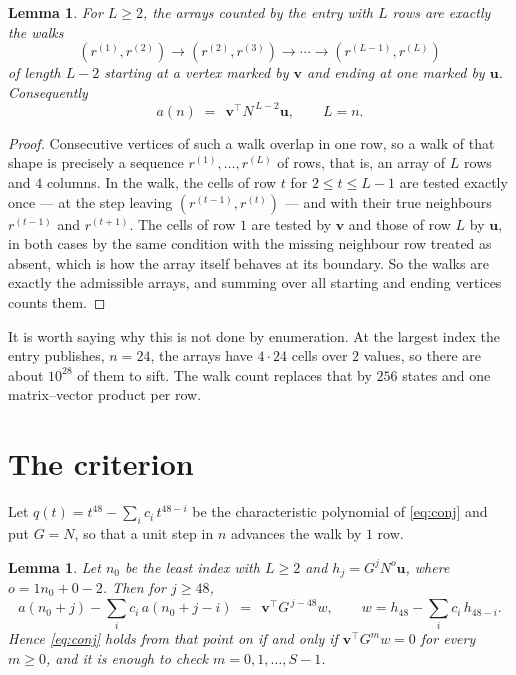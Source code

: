 \documentclass[11pt,a4paper]{article}
\theoremstyle{plain}
\newtheorem{lemma}[theorem]{Lemma}
\theoremstyle{definition}
\begin{document}
\begin{lemma}\label{lem:walk}
For $L\ge2$, the arrays counted by the entry with $L$ rows are exactly the walks
\[
(r^{(1)},r^{(2)})\to(r^{(2)},r^{(3)})\to\cdots\to(r^{(L-1)},r^{(L)})
\]
of length $L-2$ starting at a vertex marked by $\mathbf{v}$ and ending at one marked by
$\mathbf{u}$. Consequently
\[
a(n)\;=\;\,\mathbf{v}^{\!\top}N^{\,L-2}\mathbf{u},\qquad L=n .
\]
\end{lemma}

\begin{proof}
Consecutive vertices of such a walk overlap in one row, so a walk of that shape is
precisely a sequence $r^{(1)},\dots,r^{(L)}$ of rows, that is, an array of $L$ rows
and $4$ columns. In the walk, the cells of row $t$ for $2\le t\le L-1$ are tested
exactly once --- at the step leaving $(r^{(t-1)},r^{(t)})$ --- and with their true
neighbours $r^{(t-1)}$ and $r^{(t+1)}$. The cells of row $1$ are tested by
$\mathbf{v}$ and those of row $L$ by $\mathbf{u}$, in both cases by the same condition
with the missing neighbour row treated as absent, which is how the array itself behaves at
its boundary. So the walks are exactly the admissible arrays, and summing over all starting
and ending vertices counts them.
\end{proof}


It is worth saying why this is not done by enumeration. At the largest index the entry
publishes, $n=24$, the arrays have $4\cdot24$ cells over
$2$ values, so there are about $10^{28}$ of them to sift. The
walk count replaces that by $256$ states and one matrix--vector product per row.
\section{The criterion}

Let $q(t)=t^{48}-\sum_i c_i\,t^{48-i}$ be the characteristic polynomial of
\eqref{eq:conj} and put $G=N$, so that a unit step in $n$ advances the walk by
$1$ row.

\begin{lemma}\label{lem:crit}
Let $n_0$ be the least index with $L\ge2$ and $h_j=G^{j}N^{o}\mathbf{u}$, where
$o=1n_0+0-2$. Then for $j\ge48$,
\[
a(n_0+j)-\sum_i c_i\,a(n_0+j-i)\;=\;\,\mathbf{v}^{\!\top}G^{\,j-48}w,
\qquad w=h_{48}-\sum_i c_i\,h_{48-i} .
\]
Hence \eqref{eq:conj} holds from that point on if and only if
$\mathbf{v}^{\!\top}G^{m}w=0$ for every $m\ge0$, and it is enough to check
$m=0,1,\dots,S-1$.
\end{lemma}
\end{document}
